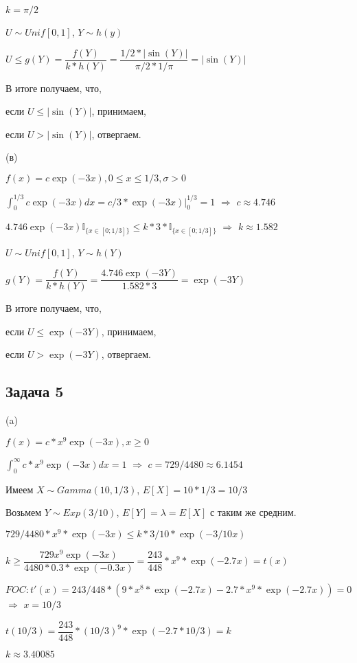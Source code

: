 \documentclass[a4paper,12pt]{article} %
\begin{document}
$k=\pi/2$ 



$U\sim Unif[0,1]$,
$Y \sim h(y)$
 
 
$U\leq g(Y) =\dfrac{f(Y)}{k*h(Y)} = \dfrac{ 1/2*|\sin(Y)| }{\pi/2*1/\pi } = |\sin(Y)|$

В итоге получаем, что,

если $U\leq |\sin(Y)|$,  принимаем, 

если $U >|\sin(Y)| $,  отвергаем.

(в)

$f(x) = c \exp(-3x) , 0\leq x\leq  1/3, \sigma>0 $

$\int_0^{1/3}  c \exp(-3x) dx = c/3 * \exp(-3x)  \biggr\rvert^{1/3}_{0} = 1 $ $\Rightarrow$ $c\approx 4.746$

$4.746 \exp(-3x) \mathbb{I}_{\{x\in [0;1/3]\}} \leq k* 3* \mathbb{I}_{\{x\in [0;1/3]\}} $ $\Rightarrow$ $k\approx 1.582$

$U\sim Unif[0,1]$,
$Y \sim h(Y) $

$g(Y) =\dfrac{f(Y)}{k*h(Y)} = \dfrac{4.746 \exp(-3Y) }{1.582 * 3} =  \exp(-3Y) $


В итоге получаем, что,

если $U\leq \exp(-3Y)$,  принимаем,
 
если $U > \exp(-3Y) $,  отвергаем.


\subsection*{Задача 5}

(a)

$f(x) = c* x^9 \exp(-3x), x\geq0$


$\int_{0}^{\infty}  c* x^9 \exp(-3x) dx =1 $ $\Rightarrow$ $c=729/4480 \approx 6.1454$

Имеем $X\sim Gamma(10,1/3) $, $E[X] =10*1/3  = 10/3 $

Возьмем $Y\sim Exp(3/10) $, $E[Y] = \lambda = E[X]$ с таким же средним. 

$729/4480 * x^9 * \exp(-3x) \leq k*3/10 * \exp(-3/10 x)$

$k \geq \dfrac{729x^9\exp(-3x)}{4480*0.3*\exp(-0.3x)} = \dfrac{243}{448} * x^9 * \exp(-2.7x) = t(x)$

$FOC: t'(x) = 243/448 *( 9* x^8 * \exp(-2.7x) -2.7*  x^9 * \exp(-2.7x)  ) = 0 $ $\Rightarrow$ $x=10/3$

$t(10/3) = \dfrac{243}{448} * (10/3)^9 * \exp(-2.7*10/3) = k$

$k\approx 3.40085$
\end{document}
